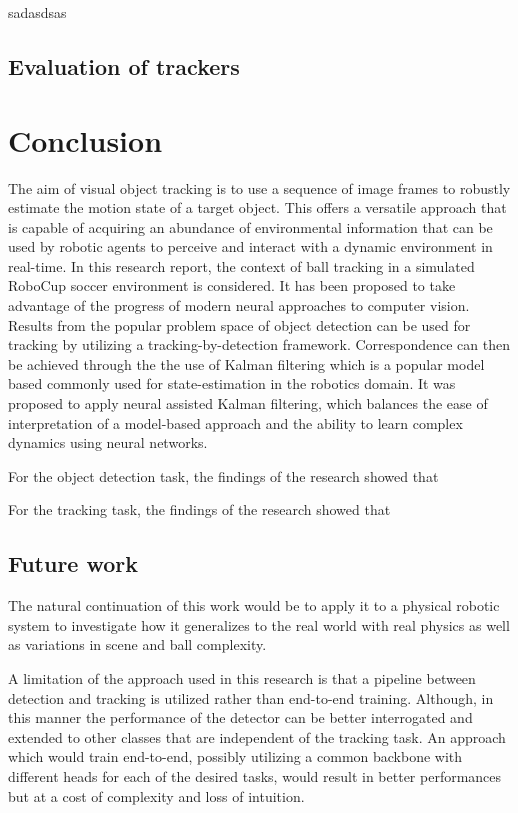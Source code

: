 \documentclass[a4paper,twoside,12pt]{report}
\begin{document}
sadasdsas

\section{Evaluation of trackers}

\chapter{Conclusion}

The aim of visual object tracking is to use a sequence of image frames to robustly estimate the motion state of a target object. This offers a versatile approach that is capable of acquiring an abundance of environmental information that can be used by robotic agents to perceive and interact with a dynamic environment in real-time. In this research report, the context of ball tracking in a simulated RoboCup soccer environment is considered. It has been proposed to take advantage of the progress of modern neural approaches to computer vision. Results from the popular problem space of object detection can be used for tracking by utilizing a tracking-by-detection framework. Correspondence can then be achieved through the the use of Kalman filtering which is a popular model based commonly used for state-estimation in the robotics domain. It was proposed to apply neural assisted Kalman filtering, which balances the ease of interpretation of a model-based approach and the ability to learn complex dynamics using neural networks. 

For the object detection task, the findings of the research showed that

For the tracking task, the findings of the research showed that

\section{Future work}

The natural continuation of this work would be to apply it to a physical robotic system to investigate how it generalizes to the real world with real physics as well as variations in scene and ball complexity.

A limitation of the approach used in this research is that a pipeline between detection and tracking is utilized rather than end-to-end training. Although, in this manner the performance of the detector can be better interrogated and extended to other classes that are independent of the tracking task. An approach which would train end-to-end, possibly utilizing a common backbone with different heads for each of the desired tasks, would result in better performances but at a cost of complexity and loss of intuition.
\end{document}
